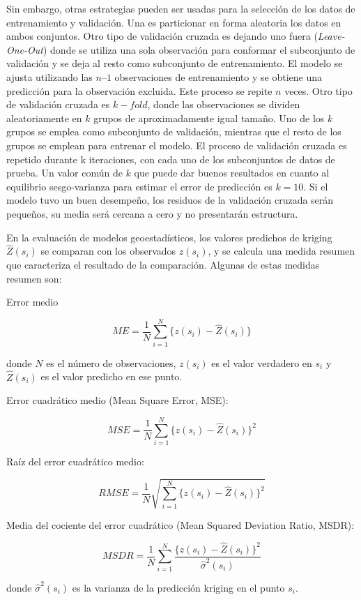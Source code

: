 \documentclass[11pt,b5paper,]{krantz}
\begin{document}
Sin embargo, otras estrategias pueden ser usadas para la selección de
los datos de entrenamiento y validación. Una es particionar en forma
aleatoria los datos en ambos conjuntos. Otro tipo de validación cruzada
es dejando uno fuera (\emph{Leave-One-Out}) donde se utiliza una sola
observación para conformar el subconjunto de validación y se deja al
resto como subconjunto de entrenamiento. El modelo se ajusta utilizando
las \(n – 1\) observaciones de entrenamiento y se obtiene una predicción
para la observación excluida. Este proceso se repite \(n\) veces. Otro
tipo de validación cruzada es \(k-fold\), donde las observaciones se
dividen aleatoriamente en \(k\) grupos de aproximadamente igual tamaño.
Uno de los \(k\) grupos se emplea como subconjunto de validación,
mientras que el resto de los grupos se emplean para entrenar el modelo.
El proceso de validación cruzada es repetido durante k iteraciones, con
cada uno de los subconjuntos de datos de prueba. Un valor común de \(k\)
que puede dar buenos resultados en cuanto al equilibrio sesgo-varianza
para estimar el error de predicción es \(k=10\). Si el modelo tuvo un
buen desempeño, los residuos de la validación cruzada serán pequeños, su
media será cercana a cero y no presentarán estructura.

En la evaluación de modelos geoestadísticos, los valores predichos de
kriging \(\hat{Z}(s_i)\) se comparan con los observados \(z(s_i)\), y se
calcula una medida resumen que caracteriza el resultado de la
comparación. Algunas de estas medidas resumen son:

Error medio

\[ME=\frac{1}{N}\sum_{i=1}^{N}\big\{z(s_i)-\hat{Z}(s_i)\big\}\]

donde \(N\) es el número de observaciones, \(z(s_i)\) es el valor
verdadero en \(s_i\) y \(\hat{Z}(s_i)\) es el valor predicho en ese
punto.

Error cuadrático medio (Mean Square Error, MSE):

\[MSE=\frac{1}{N}\sum_{i=1}^{N}{\big\{z(s_i)-\hat{Z}(s_i)\big\}^2}\]

Raíz del error cuadrático medio:

\[RMSE=\frac{1}{N}\sqrt{\sum_{i=1}^{N}\big\{z(s_i)-\hat{Z}(s_i)\big\}^2}\]

Media del cociente del error cuadrático (Mean Squared Deviation Ratio,
MSDR):

\[MSDR=\frac{1}{N} \sum_{i=1}^{N}\frac{ \big\{ z(s_i) - \hat{Z}(s_i) \big\}^2} {\hat{\sigma}^2(s_i)}\]

donde \(\hat{\sigma}^2(s_i)\) es la varianza de la predicción kriging en
el punto \(s_i\).
\end{document}
